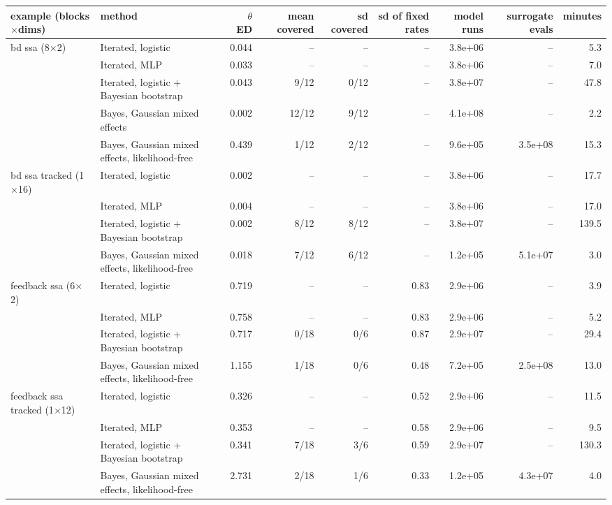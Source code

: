 \begin{tabular}{llrrrrrrr}
\toprule
example (blocks$\times$dims) & method & $\theta$ ED & mean covered & sd covered & sd of fixed rates & model runs & surrogate evals & minutes \\
\midrule
bd ssa (8$\times$2) & Iterated, logistic & 0.044 & -- & -- & -- & 3.8e+06 & -- & 5.3 \\
 & Iterated, MLP & 0.033 & -- & -- & -- & 3.8e+06 & -- & 7.0 \\
 & Iterated, logistic + Bayesian bootstrap & 0.043 & 9/12 & 0/12 & -- & 3.8e+07 & -- & 47.8 \\
 & Bayes, Gaussian mixed effects & 0.002 & 12/12 & 9/12 & -- & 4.1e+08 & -- & 2.2 \\
 & Bayes, Gaussian mixed effects, likelihood-free & 0.439 & 1/12 & 2/12 & -- & 9.6e+05 & 3.5e+08 & 15.3 \\ \addlinespace
bd ssa tracked (1$\times$16) & Iterated, logistic & 0.002 & -- & -- & -- & 3.8e+06 & -- & 17.7 \\
 & Iterated, MLP & 0.004 & -- & -- & -- & 3.8e+06 & -- & 17.0 \\
 & Iterated, logistic + Bayesian bootstrap & 0.002 & 8/12 & 8/12 & -- & 3.8e+07 & -- & 139.5 \\
 & Bayes, Gaussian mixed effects, likelihood-free & 0.018 & 7/12 & 6/12 & -- & 1.2e+05 & 5.1e+07 & 3.0 \\ \addlinespace
feedback ssa (6$\times$2) & Iterated, logistic & 0.719 & -- & -- & 0.83 & 2.9e+06 & -- & 3.9 \\
 & Iterated, MLP & 0.758 & -- & -- & 0.83 & 2.9e+06 & -- & 5.2 \\
 & Iterated, logistic + Bayesian bootstrap & 0.717 & 0/18 & 0/6 & 0.87 & 2.9e+07 & -- & 29.4 \\
 & Bayes, Gaussian mixed effects, likelihood-free & 1.155 & 1/18 & 0/6 & 0.48 & 7.2e+05 & 2.5e+08 & 13.0 \\ \addlinespace
feedback ssa tracked (1$\times$12) & Iterated, logistic & 0.326 & -- & -- & 0.52 & 2.9e+06 & -- & 11.5 \\
 & Iterated, MLP & 0.353 & -- & -- & 0.58 & 2.9e+06 & -- & 9.5 \\
 & Iterated, logistic + Bayesian bootstrap & 0.341 & 7/18 & 3/6 & 0.59 & 2.9e+07 & -- & 130.3 \\
 & Bayes, Gaussian mixed effects, likelihood-free & 2.731 & 2/18 & 1/6 & 0.33 & 1.2e+05 & 4.3e+07 & 4.0 \\
\bottomrule
\end{tabular}
